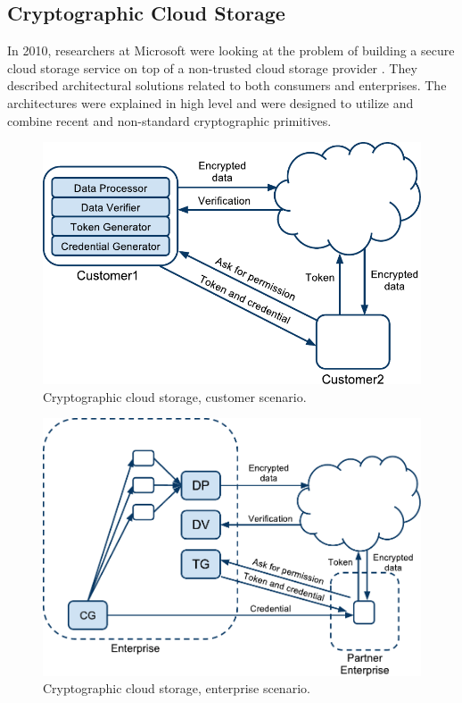 \documentclass[pdftex,english,10pt,b5paper,twoside]{book}
\begin{document}
\subsection{Cryptographic Cloud Storage}

In 2010, researchers at Microsoft were looking at the problem of building a
secure cloud storage service on top of a non-trusted cloud storage provider
\cite{microsoftresearch}. They described architectural solutions related to
both consumers and enterprises. The architectures were explained in high level
and were designed to utilize and combine recent and non-standard cryptographic
primitives.

\begin{figure}[h!]
    \centering
    \includegraphics[scale=0.6]{ArchitectureCCSC.pdf}
    \caption{Cryptographic cloud storage, customer scenario.}
    \label{fig:RW:CCS:CA}
\end{figure}

\begin{figure}[h!]
    \centering
    \includegraphics[scale=0.6]{ArchitectureCCSE.pdf}
    \caption{Cryptographic cloud storage, enterprise scenario.}
    \label{fig:RW:CCS:EA}
\end{figure}
\end{document}
